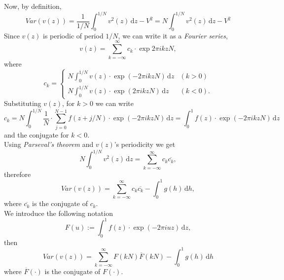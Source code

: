 Now, by definition,
\begin{equation*}
    Var(v(z)) = \frac{1}{1/N} \int_0^{1/N} v^2(z) \,\mathrm{d}z - V^2 = N \int_0^{1/N} v^2(z) \,\mathrm{d}z - V^2
\end{equation*}
Since $v(z)$ is periodic of period $1/N$, we can write it as a \textit{Fourier series},
\begin{equation*}
    v(z) = \sum_{k=-\infty}^{\infty} c_k \cdot \exp{2\pi i k zN},
\end{equation*}
where 
\begin{equation*}
    c_k = 
    \begin{cases}
         N \int_0^{1/N} v(z) \cdot \exp{(-2\pi i k z N)} \,\mathrm{d}z& (k>0)\\
         N \int_0^{1/N} v(z) \cdot \exp{(2\pi i k z N)} \,\mathrm{d}z& (k<0).
    \end{cases}
\end{equation*}
\vspace{2mm}
Substituting $v(z)$, for $k>0$ we can write
\begin{equation*}
    c_k = N \int_0^{1/N} \frac{1}{N} \cdot \sum_{j=0}^{N-1} f(z+j/N) \cdot \exp{(-2\pi i k z N)} \, \mathrm{d}z = \int_{0}^{1} f(z) \cdot \exp{(-2\pi i k z N)} \,\mathrm{d}z
\end{equation*}
and the conjugate for $k<0$.\\

Using \textit{Parseval's theorem} and $v(z)$'s periodicity we get
\begin{equation*}
    N \int_0^{1/N} v^2(z) \,\mathrm{d}z = \sum_{k=-\infty}^{\infty} c_k \overline{c_k},
\end{equation*}
therefore
\begin{equation*}
    Var(v(z)) = \sum_{k=-\infty}^{\infty} c_k \overline{c_k} - \int_{0}^{1} g(h) \,\mathrm{d}h,
\end{equation*}
where $\overline{c_k}$ is the conjugate of $c_k$.\\

We introduce the following notation
\begin{equation*}
    F(u) := \int_{0}^{1} f(z) \cdot \exp{(-2\pi i u z)} \,\mathrm{d}z,
\end{equation*}
then
\begin{equation*}
    Var(v(z)) = \sum_{k=-\infty}^{\infty} F\left( k N \right) \overline{F}\left( k N \right) - \int_{0}^{1} g(h) \,\mathrm{d}h
\end{equation*}
where $\overline{F}(\cdot)$ is the conjugate of $F(\cdot)$.\\

